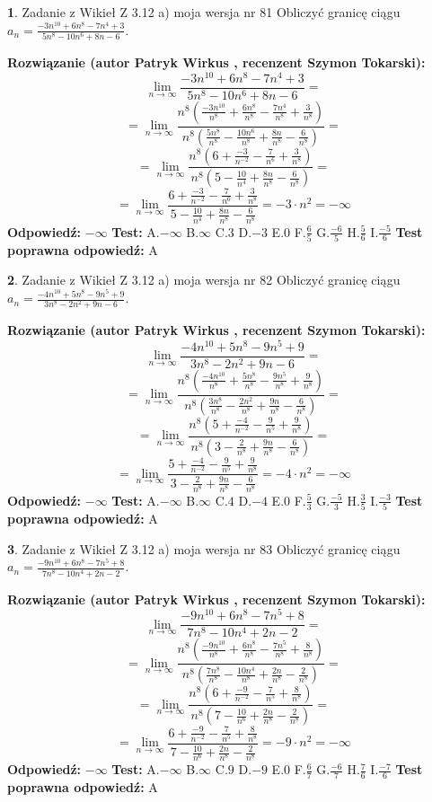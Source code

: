 \documentclass[12pt, a4paper]{article}
\theoremstyle{definition} %
\newtheorem{zad}{}
\newcommand{\zadStart}[1]{\begin{zad}#1\newline}
\newcommand{\zadStop}{\end{zad}}
\newcommand{\rozwStart}[2]{\noindent \textbf{Rozwiązanie (autor #1 , recenzent #2): }\newline}
\newcommand{\rozwStop}{\newline}
\newcommand{\odpStart}{\noindent \textbf{Odpowiedź:}\newline}
\newcommand{\odpStop}{\newline}
\newcommand{\testStart}{\noindent \textbf{Test:}\newline}
\newcommand{\testStop}{\newline}
\newcommand{\kluczStart}{\noindent \textbf{Test poprawna odpowiedź:}\newline}
\newcommand{\kluczStop}{\newline}
\begin{document}
\zadStart{Zadanie z Wikieł Z 3.12 a) moja wersja nr 81}
Obliczyć granicę ciągu $a_{n}=\frac{-3n^{10}+6n^{8}-7n^{4}+3}{5n^{8}-10n^{6}+8n-6}$.
\zadStop
\rozwStart{Patryk Wirkus}{Szymon Tokarski}
$$\lim\limits_{n\to\infty}\frac{-3n^{10}+6n^{8}-7n^{4}+3}{5n^{8}-10n^{6}+8n-6}=$$
$$=\lim\limits_{n\to\infty}\frac{n^{8}\left(\frac{-3n^{10}}{n^{8}}+\frac{6n^{8}}{n^{8}}-\frac{7n^{4}}{n^{8}}+\frac{3}{n^{8}}\right)}{n^{8}\left(\frac{5n^{8}}{n^{8}}-\frac{10n^{6}}{n^{8}}+\frac{8n}{n^{8}}-\frac{6}{n^{8}}\right)}=$$
$$=\lim\limits_{n\to\infty}\frac{n^{8}\left(6+\frac{-3}{n^{-2}}-\frac{7}{n^{6}}+\frac{3}{n^{8}}\right)}
{n^{8}\left(5-\frac{10}{n^{4}}+\frac{8n}{n^{8}}-\frac{6}{n^{8}}\right)}=$$
$$=\lim\limits_{n\to\infty}\frac{6+\frac{-3}{n^{-2}}-\frac{7}{n^{6}}+\frac{3}{n^{8}}}{5-\frac{10}{n^{4}}+\frac{8n}{n^{8}}-\frac{6}{n^{8}}}=-3\cdot n^{2} = -\infty$$
\rozwStop
\odpStart
$-\infty$
\odpStop
\testStart
A.$-\infty$
B.$\infty$
C.$3$
D.$-3$
E.$0$
F.$\frac{6}{5}$
G.$\frac{-6}{5}$
H.$\frac{5}{6}$
I.$\frac{-5}{6}$
\testStop
\kluczStart
A
\kluczStop



\zadStart{Zadanie z Wikieł Z 3.12 a) moja wersja nr 82}
Obliczyć granicę ciągu $a_{n}=\frac{-4n^{10}+5n^{8}-9n^{5}+9}{3n^{8}-2n^{2}+9n-6}$.
\zadStop
\rozwStart{Patryk Wirkus}{Szymon Tokarski}
$$\lim\limits_{n\to\infty}\frac{-4n^{10}+5n^{8}-9n^{5}+9}{3n^{8}-2n^{2}+9n-6}=$$
$$=\lim\limits_{n\to\infty}\frac{n^{8}\left(\frac{-4n^{10}}{n^{8}}+\frac{5n^{8}}{n^{8}}-\frac{9n^{5}}{n^{8}}+\frac{9}{n^{8}}\right)}{n^{8}\left(\frac{3n^{8}}{n^{8}}-\frac{2n^{2}}{n^{8}}+\frac{9n}{n^{8}}-\frac{6}{n^{8}}\right)}=$$
$$=\lim\limits_{n\to\infty}\frac{n^{8}\left(5+\frac{-4}{n^{-2}}-\frac{9}{n^{5}}+\frac{9}{n^{8}}\right)}
{n^{8}\left(3-\frac{2}{n^{8}}+\frac{9n}{n^{8}}-\frac{6}{n^{8}}\right)}=$$
$$=\lim\limits_{n\to\infty}\frac{5+\frac{-4}{n^{-2}}-\frac{9}{n^{5}}+\frac{9}{n^{8}}}{3-\frac{2}{n^{8}}+\frac{9n}{n^{8}}-\frac{6}{n^{8}}}=-4\cdot n^{2} = -\infty$$
\rozwStop
\odpStart
$-\infty$
\odpStop
\testStart
A.$-\infty$
B.$\infty$
C.$4$
D.$-4$
E.$0$
F.$\frac{5}{3}$
G.$\frac{-5}{3}$
H.$\frac{3}{5}$
I.$\frac{-3}{5}$
\testStop
\kluczStart
A
\kluczStop



\zadStart{Zadanie z Wikieł Z 3.12 a) moja wersja nr 83}
Obliczyć granicę ciągu $a_{n}=\frac{-9n^{10}+6n^{8}-7n^{5}+8}{7n^{8}-10n^{4}+2n-2}$.
\zadStop
\rozwStart{Patryk Wirkus}{Szymon Tokarski}
$$\lim\limits_{n\to\infty}\frac{-9n^{10}+6n^{8}-7n^{5}+8}{7n^{8}-10n^{4}+2n-2}=$$
$$=\lim\limits_{n\to\infty}\frac{n^{8}\left(\frac{-9n^{10}}{n^{8}}+\frac{6n^{8}}{n^{8}}-\frac{7n^{5}}{n^{8}}+\frac{8}{n^{8}}\right)}{n^{8}\left(\frac{7n^{8}}{n^{8}}-\frac{10n^{4}}{n^{8}}+\frac{2n}{n^{8}}-\frac{2}{n^{8}}\right)}=$$
$$=\lim\limits_{n\to\infty}\frac{n^{8}\left(6+\frac{-9}{n^{-2}}-\frac{7}{n^{5}}+\frac{8}{n^{8}}\right)}
{n^{8}\left(7-\frac{10}{n^{6}}+\frac{2n}{n^{8}}-\frac{2}{n^{8}}\right)}=$$
$$=\lim\limits_{n\to\infty}\frac{6+\frac{-9}{n^{-2}}-\frac{7}{n^{5}}+\frac{8}{n^{8}}}{7-\frac{10}{n^{6}}+\frac{2n}{n^{8}}-\frac{2}{n^{8}}}=-9\cdot n^{2} = -\infty$$
\rozwStop
\odpStart
$-\infty$
\odpStop
\testStart
A.$-\infty$
B.$\infty$
C.$9$
D.$-9$
E.$0$
F.$\frac{6}{7}$
G.$\frac{-6}{7}$
H.$\frac{7}{6}$
I.$\frac{-7}{6}$
\testStop
\kluczStart
A
\kluczStop
\end{document}
